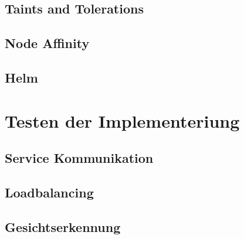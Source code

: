 \subsection{Taints and Tolerations}
\subsection{Node Affinity}
\subsection{Helm}


\section{Testen der Implementeriung}
\subsection{Service Kommunikation}
\subsection{Loadbalancing}
\subsection{Gesichtserkennung}